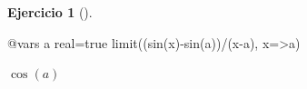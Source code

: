 \documentclass[
  a4paper,
]{scrreport}
\newenvironment{Shaded}{\begin{snugshade}}{\end{snugshade}}
\newcommand{\ConstantTok}[1]{\textcolor[rgb]{0.56,0.35,0.01}{#1}}
\newcommand{\FunctionTok}[1]{\textcolor[rgb]{0.28,0.35,0.67}{#1}}
\newcommand{\NormalTok}[1]{\textcolor[rgb]{0.00,0.23,0.31}{#1}}
\newcommand{\OperatorTok}[1]{\textcolor[rgb]{0.37,0.37,0.37}{#1}}
\newcommand{\PreprocessorTok}[1]{\textcolor[rgb]{0.68,0.00,0.00}{#1}}
\theoremstyle{definition}
\newtheorem{exercise}{Ejercicio}[chapter]
\theoremstyle{remark}
\begin{document}
\begin{exercise}[]
\begin{tcolorbox}
\begin{Shaded}
\begin{Highlighting}[]
\PreprocessorTok{@vars}\NormalTok{ a real}\OperatorTok{=}\ConstantTok{true}
\FunctionTok{limit}\NormalTok{((}\FunctionTok{sin}\NormalTok{(x)}\FunctionTok{{-}sin}\NormalTok{(a))}\OperatorTok{/}\NormalTok{(x}\OperatorTok{{-}}\NormalTok{a), x}\OperatorTok{=\textgreater{}}\NormalTok{a)}
\end{Highlighting}
\end{Shaded}

$\cos{\left(a \right)}$

\end{tcolorbox}

\end{exercise}

\leavevmode{}%
\end{document}

